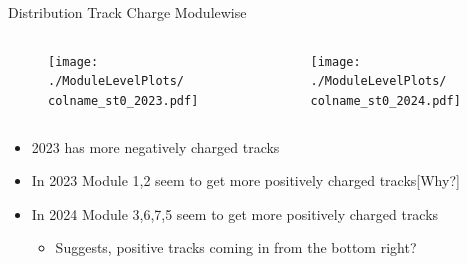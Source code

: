 \begin{frame}{Distribution Track Charge Modulewise}
    \newcommand{\colname}{Track_charge}
    \begin{columns}
        \begin{column}{0.6\linewidth}
            \begin{figure}
                \centering
                \texttt{[image: ./ModuleLevelPlots/\\colname\_st0\_2023.pdf]}
            \end{figure}
        \end{column}
        \begin{column}{0.6\linewidth}
            \begin{figure}
                \centering
                \texttt{[image: ./ModuleLevelPlots/\\colname\_st0\_2024.pdf]}
            \end{figure}
        \end{column}
    \end{columns}

    \begin{itemize}
        \small
        \item 2023 has more negatively charged tracks
        \item In 2023 Module 1,2 seem to get more positively charged tracks[Why?]
        \item In 2024 Module 3,6,7,5 seem to get more positively charged tracks
        \begin{itemize}
            \item Suggests, positive tracks coming in from the bottom right?
        \end{itemize}
    \end{itemize}
\end{frame}

